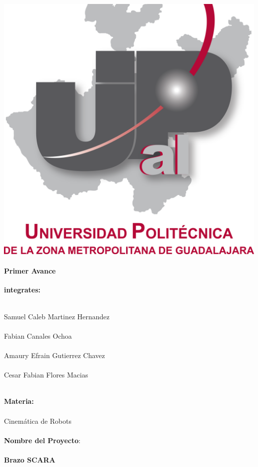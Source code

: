 \documentclass[10pt,a4paper]{article}
\begin{document}
\begin{center}
\includegraphics[scale=0.2]{../Primer_Avance/Imagenes/upzmg.png} 
\end{center}
\paragraph{\Huge Primer Avance} \textbf{\Huge integrates:} \\ \\
	\begin{Large}
		Samuel Caleb Martinez Hernandez\\ \\
		Fabian Canales Ochoa\\ \\
		Amaury Efrain Gutierrez Chavez\\ \\
		Cesar Fabian Flores Macias\\ \\
		\end{Large}
		
	
\textbf{\Huge Materia:}\\ \\
		{\Large Cinemática de Robots}\\ \\
	
{\Huge \textbf{Nombre del Proyecto}:}\\ \\
		\textbf{\Large Brazo SCARA}
		
\end{document}
